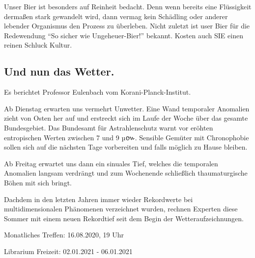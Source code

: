 \documentclass[final]{multiversum}
\begin{document}
Unser Bier ist besonders auf Reinheit bedacht. Denn wenn bereits eine Flüssigkeit dermaßen stark gewandelt wird, dann vermag kein Schädling oder anderer lebender Organismus den Prozess zu überleben. 
Nicht zuletzt ist user Bier für die Redewendung \enquote{So sicher wie Ungeheuer-Bier!} bekannt. Kosten auch SIE einen reinen Schluck Kultur.


\subsection{Und nun das Wetter.} 
Es berichtet Professor Eulenbach vom Korani-Planck-Institut.

Ab Dienstag erwarten uns vermehrt Unwetter. Eine Wand temporaler Anomalien zieht von Osten her auf und erstreckt sich im Laufe der Woche über das gesamte Bundesgebiet. Das Bundesamt für Astrahlenschutz warnt vor eröhten entropischen Werten zwischen 7 und 9 µ{\khmerfont៚}. Sensible Gemüter mit Chronophobie sollen sich auf die nächsten Tage vorbereiten und falls möglich zu Hause bleiben.

Ab Freitag erwartet uns dann ein sinuales Tief, welches die temporalen Anomalien langsam verdrängt und zum Wochenende schließlich thaumaturgische Böhen mit sich bringt. 

Dachdem in den letzten Jahren immer wieder Rekordwerte bei multidimensionalen Phänomenen verzeichnet wurden, rechnen Experten diese Sommer mit einem neuen Rekordtief seit dem Begin der Wetteraufzeichnungen. 

\begin{termine}
\item Monatliches Treffen: 16.08.2020, 19 Uhr
\item Librarium Freizeit: 02.01.2021 - 06.01.2021
\end{termine}
\impressum
\end{document}
